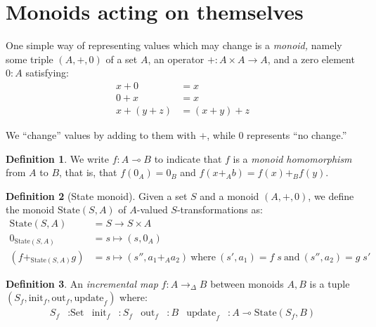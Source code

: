 \documentclass{article}
\theoremstyle{definition}
\newtheorem{definition}{Definition}
\theoremstyle{remark}
\newcommand\<\;                 %
\newcommand\lto\multimap
\newcommand\ito{\to_\D}
\newcommand\D\Delta
\newcommand\init{\text{init}}
\newcommand\update{\text{update}}
\newcommand\Set{\text{Set}}
\newcommand\State{\text{State}}
\begin{document}
\section{Monoids acting on themselves}

One simple way of representing values which may change is a \emph{monoid,} namely some triple $(A,+,0)$ of a set $A$, an operator ${+} : A \times A \to A$, and a zero element $0 : A$ satisfying:
%
\begin{align*}
  x + 0 &= x\\
  0 + x &= x\\
  x + (y + z) &= (x + y) + z
\end{align*}

\noindent
We ``change'' values by adding to them with $+$, while $0$ represents ``no change.''

\begin{definition}
  We write $f : A \lto B$ to indicate that $f$ is a \emph{monoid homomorphism} from $A$ to $B$, that is, that $f(0_A) = 0_B$ and $f(x +_A b) = f(x) +_B f(y)$.
\end{definition}

\begin{definition}[State monoid]
  Given a set $S$ and a monoid $(A,+,0)$, we define the monoid $\State(S,A)$ of $A$-valued $S$-transformations as:
%
  \begin{align*}
    \State(S,A) &= S \to S \times A\\
    0_{\State(S,A)} &= s \mapsto (s, 0_A)\\
    (f +_{\State(S,A)} g) &= s \mapsto (s'', a_1 +_A a_2)
    ~\text{where}~ (s', a_1) = f\<s ~\text{and}~ (s'', a_2) = g\<s'
  \end{align*}
\end{definition}

\newcommand\initout{\text{out}}
\newcommand\initstate{\init}

\begin{definition}
  An \emph{incremental map} $f : A \ito B$ between monoids $A, B$ is a tuple $(S_f, \initstate_f, \initout_f, \update_f)$ where:
%
  \begin{align*}
    S_f &: \Set
    &
    \initstate_f &: S_f
    &
    \initout_f &: B
    &
    \update_f &: A \lto \State({S_f}, B)
  \end{align*}
\end{definition}
\end{document}
